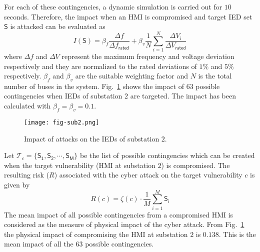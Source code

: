 For each of these contingencies, a dynamic simulation is carried out for $10$ seconds. Therefore, the impact when an HMI is compromised and target IED set $\mathsf{S}$ is attacked can be evaluated as
\begin{equation}
I(\mathsf{S})=\beta_f\dfrac{\Delta f}{\Delta f_{\mathsf{rated}}}+\beta_v\frac{1}{N}\sum_{i=1}^{N}\dfrac{\Delta V_i}{\Delta V_{\mathsf{rated}}}
\end{equation} 
where $\Delta f$ and $\Delta V$ represent the maximum frequency and voltage deviation respectively and they are normalized to the rated deviations of $1\%$ and $5\%$ respectively. $\beta_f$ and $\beta_v$ are the suitable weighting factor and $N$ is the total number of buses in the system. Fig.~\ref{fig:sub2} shows the impact of $63$ possible contingencies when IEDs of substation $2$ are targeted. The impact has been calculated with $\beta_f=\beta_v=0.1$.
\begin{figure}[htbp]
	\centering
	\texttt{[image: fig-sub2.png]}
	\caption{Impact of attacks on the IEDs of substation $2$.}
	\label{fig:sub2}
\end{figure}

Let $\mathcal{T}_c=\{\mathsf{S_1},\mathsf{S_2},\cdots,\mathsf{S_M}\}$ be the list of possible contingencies which can be created when the target vulnerability (HMI at substation $2$) is compromised. The resulting risk ($R$) associated with the cyber attack on the target vulnerability $c$ is given by
\begin{equation}
R(c)=\zeta(c)\cdot\dfrac{1}{M}\sum_{i=1}^{M}\mathsf{S_i}
\end{equation}
The mean impact of all possible contingencies from a compromised HMI is considered as the measure of physical impact of the cyber attack. From Fig.~\ref{fig:sub2} the physical impact of compromising the HMI at substation $2$ is $0.138$. This is the mean impact of all the $63$ possible contingencies.